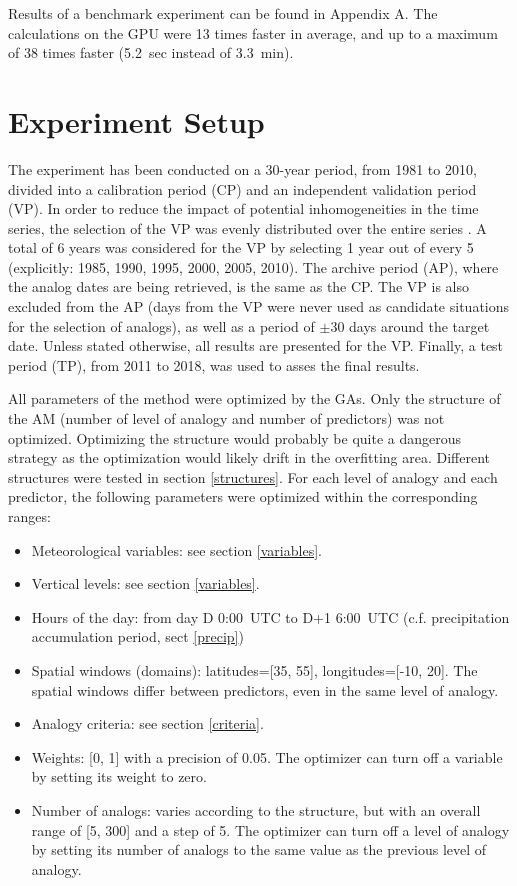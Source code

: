 \documentclass[draft]{agujournal2019}
\begin{document}
Results of a benchmark experiment can be found in Appendix A. The calculations on the GPU were 13 times faster in average, and up to a maximum of 38 times faster (5.2~sec instead of 3.3~min).


\section{Experiment Setup}
\label{setup}

The experiment has been conducted on a 30-year period, from 1981 to 2010, divided into a calibration period (CP) and an independent validation period (VP). In order to reduce the impact of potential inhomogeneities in the time series, the selection of the VP was evenly distributed over the entire series \cite<as in>[]{BenDaoud2010}. A total of 6 years was considered for the VP by selecting 1 year out of every 5 (explicitly: 1985, 1990, 1995, 2000, 2005, 2010). The archive period (AP), where the analog dates are being retrieved, is the same as the CP. The VP is also excluded from the AP (days from the VP were never used as candidate situations for the selection of analogs), as well as a period of $\pm30$ days around the target date. Unless stated otherwise, all results are presented for the VP. Finally, a test period (TP), from 2011 to 2018, was used to asses the final results. 

All parameters of the method were optimized by the GAs. Only the structure of the AM (number of level of analogy and number of predictors) was not optimized. Optimizing the structure would probably be quite a dangerous strategy as the optimization would likely drift in the overfitting area. Different structures were tested in section \ref{structures}. For each level of analogy and each predictor, the following parameters were optimized within the corresponding ranges:

\begin{itemize}		
	\item Meteorological variables: see section \ref{variables}.
	\item Vertical levels: see section \ref{variables}.
	\item Hours of the day: from day D 0:00~UTC to D+1 6:00~UTC (c.f. precipitation accumulation period, sect \ref{precip})
	\item Spatial windows (domains): latitudes=[35, 55], longitudes=[-10, 20]. The spatial windows differ between predictors, even in the same level of analogy.
	\item Analogy criteria: see section \ref{criteria}.
	\item Weights: [0, 1] with a precision of 0.05. The optimizer can turn off a variable by setting its weight to zero.
	\item Number of analogs: varies according to the structure, but with an overall range of [5, 300] and a step of 5. The optimizer can turn off a level of analogy by setting its number of analogs to the same value as the previous level of analogy.
\end{itemize}
\end{document}
